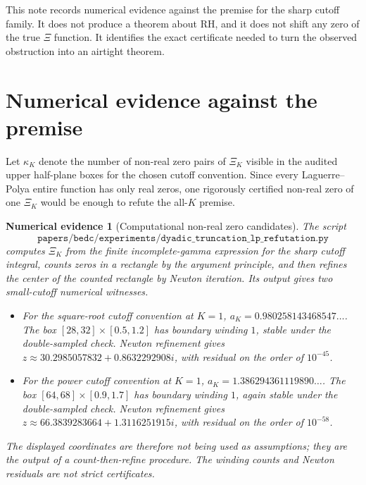 \documentclass[11pt]{article}
\newtheorem{evidence}{Numerical evidence}
\begin{document}
This note records numerical evidence against the premise for the sharp cutoff
family.  It does not produce a theorem about RH, and it does not shift any
zero of the true $\Xi$ function.  It identifies the exact certificate needed
to turn the observed obstruction into an airtight theorem.

\section{Numerical evidence against the premise}

Let $\kappa_K$ denote the number of non-real zero pairs of $\Xi_K$ visible in
the audited upper half-plane boxes for the chosen cutoff convention.  Since
every Laguerre--Polya entire function has only real zeros, one rigorously
certified non-real zero of one $\Xi_K$ would be enough to refute the all-$K$
premise.

\begin{evidence}[Computational non-real zero candidates]
\label{ev:numerical-candidates}
The script
$$
\texttt{papers/bedc/experiments/dyadic\_truncation\_lp\_refutation.py}
$$
computes $\Xi_K$ from the finite incomplete-gamma expression for the sharp
cutoff integral, counts zeros in a rectangle by the argument principle, and
then refines the center of the counted rectangle by Newton iteration.  Its
output gives two small-cutoff numerical witnesses.

\begin{itemize}
\item For the square-root cutoff convention at $K=1$,
$a_K=0.980258143468547\ldots$.  The box
$[28,32]\times[0.5,1.2]$ has boundary winding $1$, stable under the
double-sampled check.  Newton refinement gives
$z\approx30.2985057832+0.8632292908i$, with residual on the order of
$10^{-45}$.
\item For the power cutoff convention at $K=1$,
$a_K=1.386294361119890\ldots$.  The box
$[64,68]\times[0.9,1.7]$ has boundary winding $1$, again stable under the
double-sampled check.  Newton refinement gives
$z\approx66.3839283664+1.3116251915i$, with residual on the order of
$10^{-58}$.
\end{itemize}

The displayed coordinates are therefore not being used as assumptions; they
are the output of a count-then-refine procedure.  The winding counts and
Newton residuals are not strict certificates.
\end{evidence}
\end{document}
